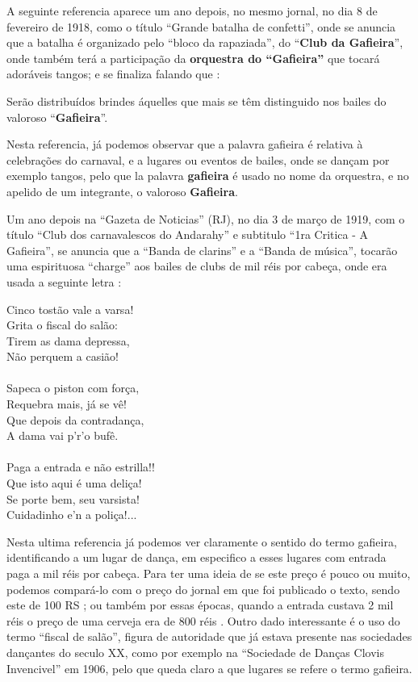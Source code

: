 A seguinte referencia aparece um ano depois, no mesmo jornal,
no dia 8 de fevereiro de 1918, como o título ``Grande batalha de confetti'',
onde se anuncia que a batalha é organizado pelo ``bloco da rapaziada'',
do ``\textbf{Club da Gafieira}'', onde também terá a participação 
da \textbf{orquestra do ``Gafieira''} que tocará adoráveis tangos;
e se finaliza falando que  \cite[pp. 7]{oldgafieira2} \cite[pp. 629]{spielmann2016reflexoes}:
\begin{citando}
Serão distribuídos brindes áquelles que mais se têm distinguido nos bailes do valoroso ``\textbf{Gafieira}''.
\end{citando}
Nesta referencia, já podemos observar que a palavra gafieira é relativa à celebrações do carnaval, 
e a lugares ou eventos de bailes,
onde se dançam por exemplo tangos, 
pelo que la palavra \textbf{gafieira} é usado no nome da orquestra,
e no apelido de um integrante, o valoroso \textbf{Gafieira}.

Um ano depois na ``Gazeta de Noticias'' (RJ),
no dia 3 de março de 1919, com o título ``Club dos carnavalescos do Andarahy'' e subtitulo ``1ra Critica - A Gafieira'',
se anuncia que a ``Banda de clarins'' e a ``Banda de música'',
tocarão uma espirituosa ``charge'' aos bailes de clubs de mil réis por cabeça, 
onde era  usada a seguinte letra \cite[pp. 5]{oldgafieira3} \cite[pp. 629]{spielmann2016reflexoes}:
\begin{citando}
Cinco tostão vale a varsa!\\
Grita o fiscal do salão:\\
Tirem as dama depressa,\\
Não perquem a casião!\\ ~\\
Sapeca o piston com força,\\
Requebra mais, já se vê!\\
Que depois da contradança,\\
A dama vai p'r'o bufê.\\ ~\\
Paga a entrada e não estrilla!!\\
Que isto aqui é uma deliça!\\
Se porte bem, seu varsista!\\
Cuidadinho e'n a poliça!...
\end{citando}
Nesta ultima referencia já podemos ver claramente o sentido do termo gafieira,
identificando a um lugar de dança, em especifico a esses lugares com entrada paga a mil réis por cabeça.
Para ter uma ideia de se este preço é pouco ou muito, podemos compará-lo com o 
preço do jornal em que foi publicado o texto, sendo este de 100 RS \cite[pp. 1]{oldgafieira3};
ou também por essas épocas, 
quando a entrada custava 2 mil réis o preço de uma cerveja  era  de 800 réis \cite[pp. 1 - cad. B]{gafieira2000reis}.
Outro dado interessante é o uso do termo ``fiscal de salão'', 
figura de autoridade que já estava presente 
nas sociedades dançantes do seculo XX, como por exemplo na 
``Sociedade de Danças Clovis Invencivel'' em 1906, pelo que queda claro
a que lugares se refere o termo gafieira.


